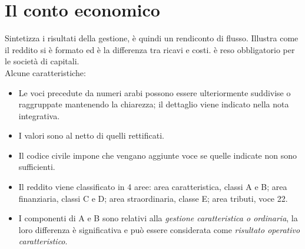 \documentclass{report}
\begin{document}
	\section{Il conto economico}
	Sintetizza i risultati della gestione, è quindi un rendiconto di flusso. Illustra come il reddito si è formato ed è la differenza tra ricavi e costi. è reso obbligatorio per le società di capitali.
	\medskip \\Alcune caratteristiche:
	\begin{itemize}
		\item Le voci precedute da numeri arabi possono essere ulteriormente suddivise o raggruppate mantenendo la chiarezza; il dettaglio viene indicato nella nota integrativa.
		\item I valori sono al netto di quelli rettificati.
		\item Il codice civile impone che vengano aggiunte voce se quelle indicate non sono sufficienti.
		\item Il reddito viene classificato in 4 aree: area caratteristica, classi A e B; area finanziaria, classi C e D; area straordinaria, classe E; area tributi, voce 22.
		\item I componenti di A e B sono relativi alla \textit{gestione caratteristica o ordinaria}, la loro differenza è significativa e può essere considerata come \textit{risultato operativo caratteristico}.
	\end{itemize}
\end{document}

